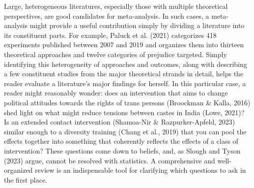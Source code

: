 \documentclass[
  man]{apa6}
\begin{document}
Large, heterogeneous literatures, especially those with multiple theoretical perspectives, are good candidates for meta-analysis. In such cases, a meta-analysis might provide a useful contribution simply by dividing a literature into its constituent parts. For example, Paluck et al. (2021) categorizes 418 experiments published between 2007 and 2019 and organizes them into thirteen theoretical approaches and twelve categories of prejudice targeted. Simply identifying this heterogeneity of approaches and outcomes, along with describing a few constituent studies from the major theoretical strands in detail, helps the reader evaluate a literature's major findings for herself. In this particular case, a reader might reasonably wonder: does an intervention that aims to change political attitudes towards the rights of trans persons (Broockman \& Kalla, 2016) shed light on what might reduce tensions between castes in India (Lowe, 2021)? Is an extended contact intervention (Shamoa-Nir \& Razpurker-Apfeld, 2023) similar enough to a diversity training (Chang et al., 2019) that you can pool the effects together into something that coherently reflects the effects of a class of intervention? These questions come down to beliefs, and, as Slough and Tyson (2023) argue, cannot be resolved with statistics. A comprehensive and well-organized review is an indispensable tool for clarifying which questions to ask in the first place.
\end{document}
